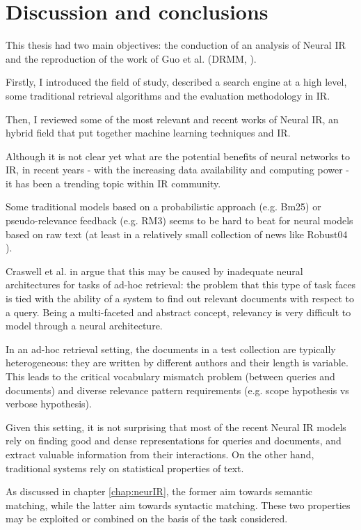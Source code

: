 \newpage
\chapter{Discussion and conclusions}

This thesis had two main objectives: the conduction of an analysis of Neural IR and the reproduction of the work of Guo et al. (DRMM, \cite{drmm}).

Firstly, I introduced the field of study, described a search engine at a high level, some traditional retrieval algorithms and the evaluation methodology in IR.

Then, I reviewed some of the most relevant and recent works of Neural IR, an hybrid field that put together machine learning techniques and IR.

Although it is not clear yet what are the potential benefits of neural networks to IR, in recent years - with the increasing data availability and computing power - it has been a trending topic within IR community.

Some traditional models based on a probabilistic approach (e.g. Bm25) or pseudo-relevance feedback (e.g. RM3) seems to be hard to beat for neural models based on raw text (at least in a relatively small collection of news like Robust04 \cite{rob04}).

Craswell et al. in \cite{nn4ir} argue that this may be caused by inadequate neural architectures for tasks of ad-hoc retrieval: the problem that this type of task faces is tied with the ability of a system to find out relevant documents with respect to a query. Being a multi-faceted and abstract concept, relevancy is very difficult to model through a neural architecture.

In an ad-hoc retrieval setting, the documents in a test collection are typically heterogeneous: they are written by different authors and their length is variable. This leads to the critical vocabulary mismatch problem (between queries and documents) and diverse relevance pattern requirements (e.g. scope hypothesis vs verbose hypothesis).

Given this setting, it is not surprising that most of the recent Neural IR models rely on finding good and dense representations for queries and documents, and extract valuable information from their interactions. On the other hand, traditional systems rely on statistical properties of text.

As discussed in chapter \ref{chap:neurIR}, the former aim towards semantic matching, while the latter aim towards syntactic matching. These two properties may be exploited or combined on the basis of the task considered.

